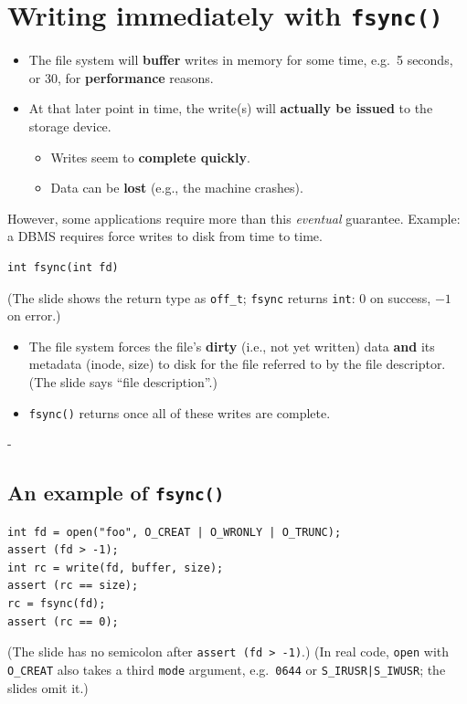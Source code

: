 \documentclass[11pt,a4paper]{article}
\makeatletter
\newcommand{\keepspace}[1]{\par\penalty-100\begingroup
  \setlength{\dimen@}{#1}\dimen@ii\pagegoal\advance\dimen@ii-\pagetotal
  \ifdim\dimen@>\dimen@ii\ifdim\dimen@ii>\z@\vfil\fi\break\fi\endgroup}
\makeatother
\begin{document}
\section{Writing immediately with \texttt{fsync()}}

\begin{itemize}
  \item The file system will \textbf{buffer} writes in memory for some time,
        e.g.\ 5 seconds, or 30, for \textbf{performance} reasons.
  \item At that later point in time, the write(s) will \textbf{actually be
        issued} to the storage device.
  \begin{itemize}
    \item Writes seem to \textbf{complete quickly}.
    \item Data can be \textbf{lost} (e.g., the machine crashes).
  \end{itemize}
\end{itemize}

However, some applications require more than this \emph{eventual}
guarantee. Example: a DBMS requires force writes to disk from time to time.

\begin{lstlisting}[numbers=none]
int fsync(int fd)
\end{lstlisting}
{\small (The slide shows the return type as \texttt{off\_t}; \texttt{fsync}
returns \texttt{int}: 0 on success, \(-1\) on error.)}
\begin{itemize}
  \item The file system forces the file's \textbf{dirty} (i.e., not yet written)
        data \textbf{and} its metadata (inode, size) to disk for the file
        referred to by the file descriptor. {\small (The slide says ``file description''.)}
  \item \texttt{fsync()} returns once all of these writes are complete.
\end{itemize}

\keepspace{7\baselineskip}
\subsection{An example of \texttt{fsync()}}

\begin{lstlisting}
int fd = open("foo", O_CREAT | O_WRONLY | O_TRUNC);
assert (fd > -1);
int rc = write(fd, buffer, size);
assert (rc == size);
rc = fsync(fd);
assert (rc == 0);
\end{lstlisting}
{\small (The slide has no semicolon after \texttt{assert (fd > -1)}.)}
{\small (In real code, \texttt{open} with \texttt{O\_CREAT} also takes a third
\texttt{mode} argument, e.g.\ \texttt{0644} or \texttt{S\_IRUSR|S\_IWUSR};
the slides omit it.)}
\end{document}
